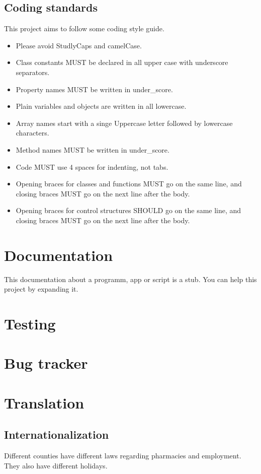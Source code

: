 \subsection{Coding standards}
This project aims to follow some coding style guide.
\begin{itemize}
\item Please avoid StudlyCaps and camelCase.
\item Class constants MUST be declared in all upper case with underscore separators.
\item Property names MUST be written in under{\_}score.
\item Plain variables and objects are written in all lowercase.
\item Array names start with a singe Uppercase letter followed by lowercase characters.
\item Method names MUST be written in under{\_}score.

\item Code MUST use 4 spaces for indenting, not tabs.
\item Opening braces for classes and functions MUST go on the same line, and closing braces MUST go on the next line after the body.
\item Opening braces for control structures SHOULD go on the same line, and closing
braces MUST go on the next line after the body.
\end{itemize}

\section{Documentation}
This documentation about a programm, app or script is a stub. You can help this project by expanding it.

\section{Testing}
\section{Bug tracker}
\section{Translation}
\subsection{Internationalization}
Different counties have different laws regarding pharmacies and employment. They also have different holidays.
